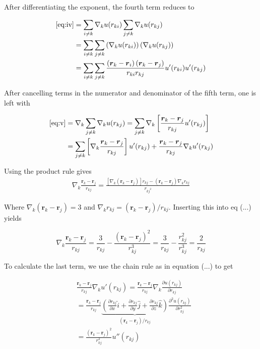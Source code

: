\documentclass[
    a4paper, aps, twocolumn, floatfix, superscriptaddress,
    nofootinbib]{revtex4-1}
\begin{document}
\begin{appendices}
After differentiating the exponent, the fourth term reduces to 

\begin{align*}
    \eqref{eq:iv} &= \sum_{i\neq k} \nabla_k u(r_{ki}) \sum_{j\neq k} \nabla_k u(r_{kj})\\
    &= \sum_{i\neq k} \sum_{j\neq k} \left(\nabla_k u(r_{ki})\right) \left(\nabla_k u(r_{kj})\right) \\
    &= \sum_{i\neq k} \sum_{j \neq k} \frac{\left(\boldsymbol{r}_k - \boldsymbol{r}_i\right)\left(\boldsymbol{r}_k - \boldsymbol{r}_j\right)}{r_{ki} r_{kj}} u'(r_{ki}) u'(r_{kj})
\end{align*}

After cancelling terms in the numerator and denominator of the fifth term, one is left with 

\begin{align*}
    \eqref{eq:v} &= \nabla_k \sum_{j\neq k} \nabla_k u(r_{kj}) = \sum_{j \neq k} \nabla_k \left[\frac{\boldsymbol{r}_k - \boldsymbol{r}_j}{r_{kj}} u'(r_{kj})\right] \\
    &= \sum_{j\neq k}   \left[\nabla_k \frac{\boldsymbol{r}_k - \boldsymbol{r}_j}{r_{kj}}\right]u'(r_{kj}) + \frac{\boldsymbol{r}_k - \boldsymbol{r}_j}{r_{kj}}\nabla_k u'(r_{kj})
\end{align*}

Using the product rule gives
\begin{align*}
    \nabla_k \frac{\boldsymbol{r}_k - \boldsymbol{r}_j}{r_{kj}} = \frac{\left[\nabla_k (\boldsymbol{r}_k - \boldsymbol{r}_j) \right]r_{kj} - (\boldsymbol{r}_k -\boldsymbol{r}_j)\nabla_k r_{kj}}{r_{kj^2}}
\end{align*}

Where $\nabla_k (\boldsymbol{r}_k - \boldsymbol{r}_j) = 3$ and $\nabla_k r_{kj} = (\boldsymbol{r}_k - \boldsymbol{r}_j)/r_{kj}$. Inserting this into eq (...) yields 

\begin{equation*}
    \nabla_k \frac{\boldsymbol{r}_k - \boldsymbol{r}_j}{r_{kj}} = \frac{3}{r_{kj}} - \frac{(\boldsymbol{r}_k - \boldsymbol{r}_j)^2}{r_{kj}^3} = \frac{3}{r_{kj}}- \frac{r_{kj}^2}{r_{kj}^3} = \frac{2}{r_{kj}} 
\end{equation*}

To calculate the last term, we use the chain rule as in equation (...) to get 

\begin{align*}
    &\frac{\boldsymbol{r}_k - \boldsymbol{r}_j}{r_{kj}}\nabla_k u'(r_{kj}) = \frac{\boldsymbol{r}_k - \boldsymbol{r}_j}{r_{kj}}\nabla_k \frac{\partial u(r_{kj})}{\partial r_{kj}} \\
    &=\frac{\boldsymbol{r}_k - \boldsymbol{r}_j}{r_{kj}} \underbrace{ \left( \frac{\partial r_{kj}}{\partial x} \hat{i} + \frac{\partial r_{kj}}{\partial y} \hat{j} + \frac{\partial r_{kj}}{\partial z} \hat{k} \right)}_{(\boldsymbol{r}_k - \boldsymbol{r}_j)/r_{kj}} \frac{\partial^2 u(r_{kj})}{\partial r_{kj}^2} \\ 
    &= \frac{(\boldsymbol{r}_k - \boldsymbol{r}_j)^2}{r_{kj}^2} u''(r_{kj}) 
\end{align*}


\end{appendices}
\end{document}
